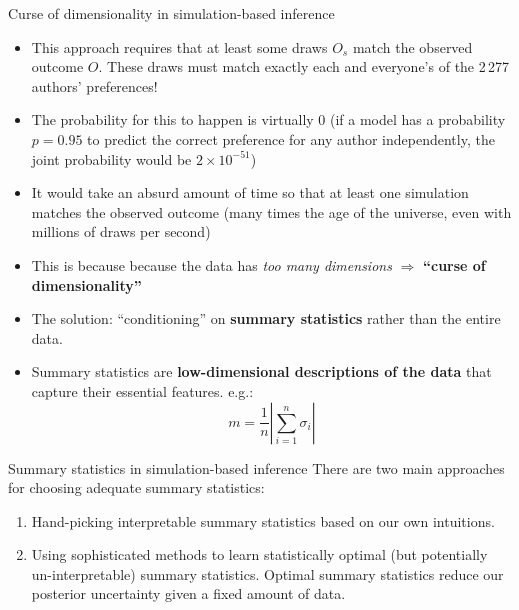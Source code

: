 \documentclass[10pt]{beamer}
\begin{document}
\begin{frame}{Curse of dimensionality in simulation-based inference}
    \begin{itemize}
        \item<1-> This approach requires that at least some draws $O_s$ match the observed outcome $O$. These draws must match exactly each and everyone's of the 2\,277 authors' preferences!
        \item<2-> The probability for this to happen is virtually 0 (if a model has a probability $p=0.95$ to predict the correct preference for any author independently, the joint probability would be $2\times 10^{-51}$)
        \item<3-> It would take an absurd amount of time so that at least one simulation matches the observed outcome (many times the age of the universe, even with millions of draws per second)
        \item<4-> This is because because the data has \textit{too many dimensions} $\Rightarrow$ \textbf{``curse of dimensionality''}
        \item<5-> The solution: ``conditioning'' on \textbf{summary statistics} rather than the entire data.
        \item<6-> Summary statistics are \textbf{low-dimensional descriptions of the data} that capture their essential features. e.g.:
        \begin{equation}
            m = \frac{1}{n}|\sum_{i=1}^n \sigma_i|
        \end{equation}
    \end{itemize}
\end{frame}

\begin{frame}{Summary statistics in simulation-based inference}
    There are two main approaches for choosing adequate summary statistics:
    \begin{enumerate}
        \item Hand-picking interpretable summary statistics based on our own intuitions.
        \item Using sophisticated methods to learn statistically optimal (but potentially un-interpretable) summary statistics. Optimal summary statistics reduce our posterior uncertainty given a fixed amount of data.
    \end{enumerate}
\end{frame}
\end{document}
